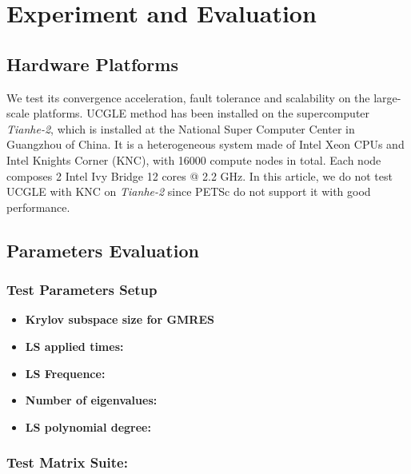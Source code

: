 \section{Experiment and Evaluation}\label{Experiment and Evaluation}

\subsection{Hardware Platforms}

We test its convergence acceleration, fault tolerance and scalability on the large-scale platforms. UCGLE method has been installed on the supercomputer \textit{Tianhe-2}, which is installed at the National Super Computer Center in Guangzhou of China. It is a heterogeneous system made of Intel Xeon CPUs and Intel Knights Corner (KNC), with 16000 compute nodes in total. Each node composes 2 Intel Ivy Bridge 12 cores @ 2.2 GHz. In this article, we do not test UCGLE with KNC on \textit{Tianhe-2} since PETSc do not support it with good performance.

\subsection{Parameters Evaluation}

\subsubsection{Test Parameters Setup}

\begin{itemize}
	\item \textbf{Krylov subspace size for GMRES }
	\item \textbf{LS applied times: }
	\item \textbf{LS Frequence:}
\end{itemize}

\begin{itemize}
	\item \textbf{Number of eigenvalues: }
\end{itemize}

\begin{itemize}
	\item \textbf{LS polynomial degree: }
\end{itemize}

\subsubsection{Test Matrix Suite: }

